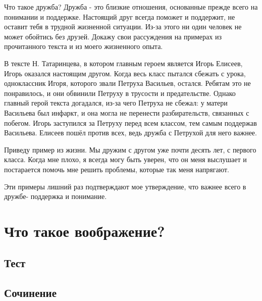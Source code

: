 \documentclass[12pt, letterpaper]{article}
\begin{document}
Что такое дружба? Дружба -  это близкие отношения, основанные прежде всего на понимании и поддержке. Настоящий друг всегда поможет и поддержит, не оставит тебя в трудной жизненной ситуации. Из-за этого ни один человек не может обойтись без друзей. Докажу свои рассуждения на примерах из прочитанного текста и из моего жизненного опыта.

В тексте Н. Татаринцева, в котором главным героем является Игорь Елисеев, Игорь оказался настоящим другом.  Когда весь класс пытался сбежать с урока, одноклассник Игоря, которого звали Петруха Васильев, остался. Ребятам это не понравилось, и они обвинили Петруху в трусости и предательстве. Однако главный герой текста догадался, из-за чего Петруха не сбежал: у матери Васильева был инфаркт, и она могла не перенести разбирательств, связанных с побегом. Игорь заступился за Петруху перед всем классом, тем самым поддержав Васильева. Елисеев пошёл против всех, ведь дружба с Петрухой для него важнее. 

Приведу пример из жизни. Мы дружим с другом уже почти десять лет, с первого класса. Когда мне плохо, я всегда могу быть уверен, что он меня выслушает и постарается помочь мне решить проблемы, которые так меня напрягают.

Эти примеры лишний раз подтверждают мое утверждение,  что важнее всего в дружбе-  поддержка и понимание.

\section{Что такое воображение?}
\subsection{Тест}

\subsection{Сочинение}
\end{document}
